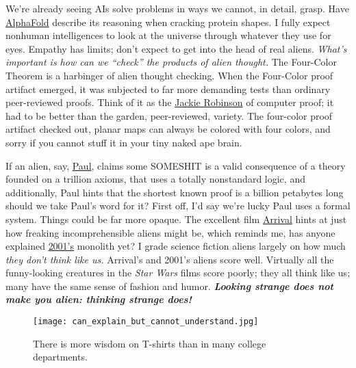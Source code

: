We're already seeing AIs solve problems in ways we cannot, in detail,
grasp. Have
\href{https://www.deepmind.com/research/highlighted-research/alphafold}{AlphaFold}
describe its reasoning when cracking protein shapes. I fully expect
nonhuman intelligences to look at the universe through whatever they use
for eyes. Empathy has limits; don't expect to get into the head of real
aliens. \emph{What's important is how can we ``check'' the products of
alien thought.} The Four-Color Theorem is a harbinger of alien thought
checking. When the Four-Color proof artifact emerged, it was subjected
to far more demanding tests than ordinary peer-reviewed proofs. Think of
it as the \href{https://jackierobinson.com/}{Jackie Robinson} of
computer proof; it had to be better than the garden, peer-reviewed,
variety. The four-color proof artifact checked out, planar maps can
always be colored with four colors, and sorry if you cannot stuff it in
your tiny naked ape brain.

If an alien, say, \href{https://www.imdb.com/title/tt1092026/}{Paul},
claims some SOMESHIT is a valid consequence of a theory founded on a
trillion axioms, that uses a totally nonstandard logic, and
additionally, Paul hints that the shortest known proof is a billion
petabytes long should we take Paul's word for it? First off, I'd say
we're lucky Paul uses a formal system. Things could be far more opaque.
The excellent film \href{https://www.imdb.com/title/tt2543164/}{Arrival}
hints at just how freaking incomprehensible aliens might be, which
reminds me, has anyone explained
\href{https://www.imdb.com/title/tt0062622/}{2001's} monolith yet? I
grade science fiction aliens largely on how much \emph{they don't think
like us.} Arrival's and 2001's aliens score well. Virtually all the
funny-looking creatures in the \emph{Star Wars} films score poorly; they
all think like us; many have the same sense of fashion and humor.
\emph{\textbf{Looking strange does not make you alien: thinking strange
does!}}

\captionsetup[figure]{labelformat=empty}
\begin{figure}[htbp]
\centering
\texttt{[image: can\_explain\_but\_cannot\_understand.jpg]}
\caption[T-shirt wisdom]{There is more wisdom on T-shirts than in many college departments.}
\label{fig:7333x0}
\end{figure}

